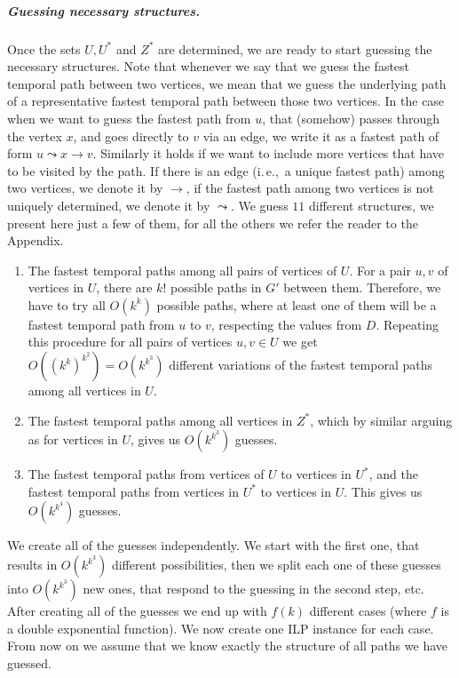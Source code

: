 \documentclass[a4paper,UKenglish,cleveref, autoref, thm-restate,anonymous]{lipics-v2021}
\newcommand{\ie}{i.\,e.,\ }
\newcommand{\deltaExact}{\textsc{Simple TGR}}
\begin{document}
\subparagraph{Guessing necessary structures. \label{sec:FPT-guessing}}
Once the sets $U, U^*$ and $Z^*$ are determined, we are ready to start guessing  the necessary structures.
Note that whenever we say that we guess the fastest temporal path between two vertices, we mean that we guess the underlying path of a representative fastest temporal path between those two vertices.
In the case when we want to guess the fastest path from $u$, that (somehow) passes through the vertex $x$, and goes directly to $v$ via an edge, we write it as a fastest path of form $u \leadsto x \rightarrow v$.
Similarly it holds if we want to include more vertices that have to be visited by the path. If there is an edge (\ie a unique fastest path) among two vertices, we denote it by $\rightarrow$,
if the fastest path among two vertices is not uniquely determined, we denote it by $\leadsto$.
We guess $11$ different structures, we present here just a few of them, for all the others we refer the reader to the Appendix.
\begin{enumerate}[G-1.]
    \item \label{FPT-guessFTPamongU}
    The fastest temporal paths among all pairs of vertices of $U$.
    For a pair $u,v$ of vertices in $U$, there are $k!$ possible paths in $G'$ between them. 
    Therefore, we have to try all $O(k^k)$ possible paths, where at least one of them will be a fastest temporal path from $u$ to $v$, respecting the values from $D$.
    Repeating this procedure for all pairs of vertices $u,v \in U$ we get $O((k^k)^{k^2})=O(k^{k^3})$ different variations of the fastest temporal paths among all vertices in $U$.
    \item \label{FPT-guessFTPamongZstar}
    The fastest temporal paths among all vertices in $Z^*$, 
    which by similar arguing as for vertices in $U$, gives us $O(k^{k^3})$ guesses.

    \setcounter{enumi}{3}
    
    \item \label{FPT-guessFTPamongUandUstar}
    The fastest temporal paths from vertices of $U$ to vertices in $U^*$,
    and the fastest temporal paths from vertices in $U^*$ to vertices in $U$.
    This gives us $O(k^{k^4})$ guesses.
\end{enumerate}
%
We create all of the guesses independently.
We start with the first one, that results in $O(k^{k^3})$ different possibilities, then we split each one of these guesses into $O(k^{k^3})$ new ones, that respond to the guessing in the second step, etc.
After creating all of the guesses we end up with $f(k)$ different cases (where $f$ is a double exponential function).
We now create one ILP instance for each case.
From now on we assume that we know exactly the structure of all paths we have guessed.
\end{document}
